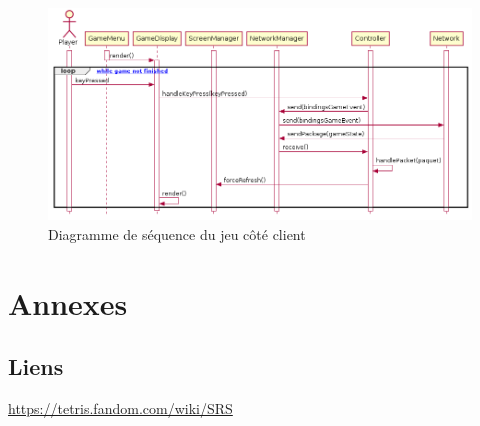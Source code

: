 \documentclass{article}
\begin{document}
\begin{figure}[H]
    \centering
    \includegraphics[width=1\textwidth]{../../res/uml/sequence/GameClientSequence.png}
    \caption{Diagramme de séquence du jeu côté client}
    \label{fig:GameClientSeqDiagram}
\end{figure}





\section{Annexes}

\subsection{Liens}

\href{Super Rotation System}{https://tetris.fandom.com/wiki/SRS}
\end{document}
